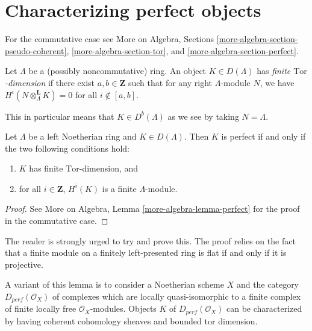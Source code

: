 \section{Characterizing perfect objects}
\label{section-characterizing-perfect}

\noindent
For the commutative case see
More on Algebra, Sections
\ref{more-algebra-section-pseudo-coherent},
\ref{more-algebra-section-tor}, and
\ref{more-algebra-section-perfect}.

\begin{definition}
\label{definition-finite-tor-dimension}
Let $\Lambda$ be a (possibly noncommutative) ring.
An object $K\in D(\Lambda)$ has {\it finite $\text{Tor}$-dimension}
if there exist $a, b \in \mathbf{Z}$ such that for any
right $\Lambda$-module $N$, we have
$H^i(N \otimes_{\Lambda}^\mathbf{L} K) = 0$ for all
$i \not \in [a, b]$.
\end{definition}

\noindent
This in particular means that $K \in D^b(\Lambda)$ as we see by taking
$N = \Lambda$.

\begin{lemma}
\label{lemma-characterize-perfect}
Let $\Lambda$ be a left Noetherian ring and $K\in D(\Lambda)$. Then $K$ is
perfect if and only if the two following conditions hold:
\begin{enumerate}
\item
$K$ has finite $\text{Tor}$-dimension, and
\item
for all $i \in \mathbf{Z}$, $H^i(K)$ is a finite $\Lambda$-module.
\end{enumerate}
\end{lemma}

\begin{proof}
See More on Algebra, Lemma \ref{more-algebra-lemma-perfect}
for the proof in the commutative case.
\end{proof}

\noindent
The reader is strongly urged to try and prove this. The proof relies on the
fact that a finite module on a finitely left-presented ring is flat if and only
if it is projective.

\begin{remark}
\label{remark-variant}
A variant of this lemma is to consider a Noetherian scheme $X$
and the category $D_{perf}(\mathcal{O}_X)$ of complexes which are locally
quasi-isomorphic to a finite complex of finite locally free
$\mathcal{O}_X$-modules. Objects $K$ of $D_{perf}(\mathcal{O}_X)$
can be characterized by having coherent cohomology sheaves and
bounded tor dimension.
\end{remark}








